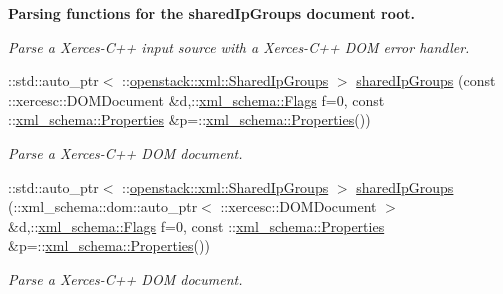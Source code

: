 \begin{Indent}{\bf Parsing functions for the sharedIpGroups document root.}
\begin{DoxyCompactItemize}
\begin{DoxyCompactList}\small\item\em Parse a Xerces-\/C++ input source with a Xerces-\/C++ DOM error handler. \item\end{DoxyCompactList}\item 
::std::auto\_\-ptr$<$ ::\hyperlink{classopenstack_1_1xml_1_1SharedIpGroups}{openstack::xml::SharedIpGroups} $>$ \hyperlink{namespaceopenstack_1_1xml_aa207e2bddd64b85e0e70d8b5faf2313e}{sharedIpGroups} (const ::xercesc::DOMDocument \&d,::\hyperlink{namespacexml__schema_affb4c227cbd9aa7453dd1dc5a1401943}{xml\_\-schema::Flags} f=0, const ::\hyperlink{namespacexml__schema_ad27ce19a7ee1d3b1064092648898f64c}{xml\_\-schema::Properties} \&p=::\hyperlink{namespacexml__schema_ad27ce19a7ee1d3b1064092648898f64c}{xml\_\-schema::Properties}())
\begin{DoxyCompactList}\small\item\em Parse a Xerces-\/C++ DOM document. \item\end{DoxyCompactList}\item 
::std::auto\_\-ptr$<$ ::\hyperlink{classopenstack_1_1xml_1_1SharedIpGroups}{openstack::xml::SharedIpGroups} $>$ \hyperlink{namespaceopenstack_1_1xml_aa179774e193c6e1b3d2dd201de024e27}{sharedIpGroups} (::xml\_\-schema::dom::auto\_\-ptr$<$ ::xercesc::DOMDocument $>$ \&d,::\hyperlink{namespacexml__schema_affb4c227cbd9aa7453dd1dc5a1401943}{xml\_\-schema::Flags} f=0, const ::\hyperlink{namespacexml__schema_ad27ce19a7ee1d3b1064092648898f64c}{xml\_\-schema::Properties} \&p=::\hyperlink{namespacexml__schema_ad27ce19a7ee1d3b1064092648898f64c}{xml\_\-schema::Properties}())
\begin{DoxyCompactList}\small\item\em Parse a Xerces-\/C++ DOM document. \item\end{DoxyCompactList}\end{DoxyCompactItemize}
\end{Indent}
